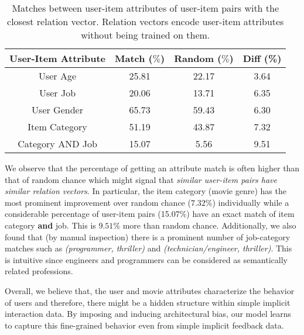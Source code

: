 \documentclass[sigconf]{acmart}
\begin{document}
\begin{table}[htbp]
  \centering
 \small
    \begin{tabular}{c|c|c|c}
    \midrule
    User-Item Attribute & Match ($\%$)  & Random ($\%$) & Diff (\%)\\
    \midrule
    User Age   &   25.81    & 22.17 &  3.64\\
    User Job   &  20.06     & 13.71 & 6.35\\
    User Gender & 65.73      & 59.43 & 6.30\\
    Item Category & 51.19      & 43.87 & 7.32 \\
    Category AND Job &  15.07    & 5.56 & 9.51 \\
    \midrule
    \end{tabular}\caption{Matches between user-item attributes of user-item pairs with the closest relation vector. Relation vectors encode user-item attributes without being trained on them.}
  \label{tab:relation_match}\end{table}We observe that the percentage of getting an attribute match is often higher than that of random chance which might signal that \textit{similar user-item pairs have similar relation vectors}. In particular, the item category (movie genre) has the most prominent improvement over random chance ($7.32\%$) individually while a considerable percentage of user-item pairs (15.07\%) have an exact match of item category \textbf{and} job. This is $9.51\%$ more than random chance. Additionally, we also found that (by manual inspection) there is a prominent number of job-category matches such as \textit{(programmer, thriller)} and \textit{(technician/engineer, thriller)}. This is intuitive since engineers and programmers can be considered as semantically related professions. 

Overall, we believe that, the user and movie attributes characterize the behavior of users and therefore, there might be a hidden structure within simple implicit interaction data. By imposing and inducing architectural bias, our model learns to capture this fine-grained behavior even from simple implicit feedback data. 
\end{document}
